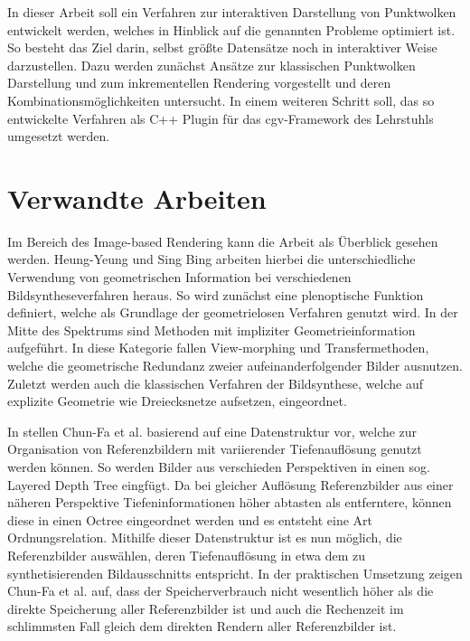 \documentclass[hyperref, beleg, german]{cgvpub}
\begin{document}
In dieser Arbeit soll ein Verfahren zur interaktiven Darstellung von Punktwolken
entwickelt werden, welches in Hinblick auf die genannten Probleme optimiert ist.
So besteht das Ziel darin, selbst größte Datensätze noch in interaktiver Weise
darzustellen. Dazu werden zunächst Ansätze zur klassischen Punktwolken
Darstellung und zum inkrementellen Rendering vorgestellt und deren
Kombinationsmöglichkeiten untersucht. In einem weiteren Schritt soll, das so
entwickelte Verfahren als C++ Plugin für das cgv-Framework des Lehrstuhls
umgesetzt werden.

\chapter{Verwandte Arbeiten}
\label{sec:verwandte_arbeiten}

Im Bereich des Image-based Rendering kann die Arbeit \cite{shum2000review} als
Überblick gesehen werden. Heung-Yeung und Sing Bing arbeiten hierbei die
unterschiedliche Verwendung von geometrischen Information bei verschiedenen
Bildsyntheseverfahren heraus. So wird zunächst eine plenoptische Funktion
definiert, welche als Grundlage der geometrielosen Verfahren genutzt wird. In
der Mitte des Spektrums sind Methoden mit impliziter Geometrieinformation
aufgeführt. In diese Kategorie fallen View-morphing und Transfermethoden, welche
die geometrische Redundanz zweier aufeinanderfolgender Bilder ausnutzen. Zuletzt
werden auch die klassischen Verfahren der Bildsynthese, welche auf explizite
Geometrie wie Dreiecksnetze aufsetzen, eingeordnet.

In \cite{chang1999ldi} stellen Chun-Fa et al. basierend auf \cite{he1998layered}
eine Datenstruktur vor, welche zur Organisation von Referenzbildern mit
variierender Tiefenauflösung genutzt werden können. So werden Bilder aus
verschieden Perspektiven in einen sog. Layered Depth Tree eingfügt. Da bei
gleicher Auflösung Referenzbilder aus einer näheren Perspektive
Tiefeninformationen höher abtasten als entferntere, können diese in einen Octree
eingeordnet werden und es entsteht eine Art Ordnungsrelation. Mithilfe dieser
Datenstruktur ist es nun möglich, die Referenzbilder auswählen, deren
Tiefenauflösung in etwa dem zu synthetisierenden Bildausschnitts entspricht. In
der praktischen Umsetzung zeigen Chun-Fa et al. auf, dass der Speicherverbrauch
nicht wesentlich höher als die direkte Speicherung aller Referenzbilder ist und
auch die Rechenzeit im schlimmsten Fall gleich dem direkten Rendern aller
Referenzbilder ist.
\end{document}
